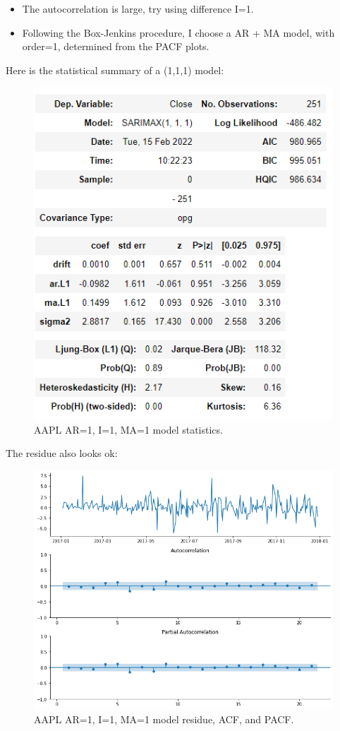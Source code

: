 \documentclass[11pt]{article}
\begin{document}
\begin{itemize}
\item The autocorrelation is large, try using difference I=1.
\item Following the Box-Jenkins procedure, I choose a AR + MA model, with order=1, determined from the PACF plots.
\end{itemize}

\newpage

Here is the statistical summary of a (1,1,1) model:

\begin{figure}[h!]
\centerline{\includegraphics[scale=0.45]{arima2.png}}
\caption{AAPL AR=1, I=1, MA=1 model statistics.}
\end{figure}

The residue also looks ok:

\begin{figure}[h!]
\centerline{\includegraphics[scale=0.45]{arima3.png}}
\caption{AAPL AR=1, I=1, MA=1 model residue, ACF, and PACF.}
\end{figure}
\end{document}
